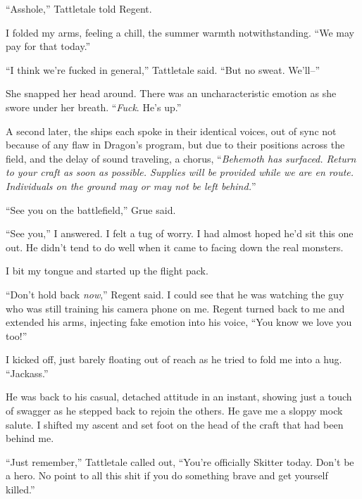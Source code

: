 ``Asshole,'' Tattletale told Regent.



I folded my arms, feeling a chill, the summer warmth notwithstanding.  ``We may pay for that today.''



``I think we're fucked in general,'' Tattletale said.  ``But no sweat.  We'll--''



She snapped her head around.  There was an uncharacteristic emotion as she swore under her breath.  ``\emph{Fuck}.  He's up.''



A second later, the ships each spoke in their identical voices, out of sync not because of any flaw in Dragon's program, but due to their positions across the field, and the delay of sound traveling, a chorus, ``\emph{Behemoth has surfaced.  Return to your craft as soon as possible.  Supplies will be provided while we are en route.  Individuals on the ground may or may not be left behind.}''



``See you on the battlefield,'' Grue said.



``See you,'' I answered.  I felt a tug of worry.  I had almost hoped he'd sit this one out.  He didn't tend to do well when it came to facing down the real monsters.



I bit my tongue and started up the flight pack.



``Don't hold back \emph{now},'' Regent said.  I could see that he was watching the guy who was still training his camera phone on me.  Regent turned back to me and extended his arms, injecting fake emotion into his voice, ``You know we love you too!''



I kicked off, just barely floating out of reach as he tried to fold me into a hug.  ``Jackass.''



He was back to his casual, detached attitude in an instant, showing just a touch of swagger as he stepped back to rejoin the others.  He gave me a sloppy mock salute.  I shifted my ascent and set foot on the head of the craft that had been behind me.



``Just remember,'' Tattletale called out, ``You're officially Skitter today.  Don't be a hero.  No point to all this shit if you do something brave and get yourself killed.''



